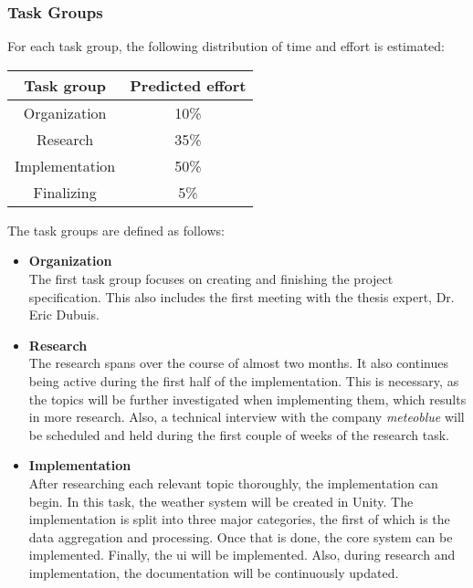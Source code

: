 
\clearpage
\subsubsection{Task Groups}
For each task group, the following distribution of time and effort is estimated:
\emptyline
\begin{tabular}{|c|c|}
    \hline
    \textbf{Task group}  & \textbf{Predicted effort}\\ \hline
    Organization        & 10\%                      \\ \hline
    Research            & 35\%                      \\ \hline
    Implementation      & 50\%                      \\ \hline
    Finalizing          & 5\%                       \\ \hline
\end{tabular}
\vspace{\baselineskip}

\noindent
The task groups are defined as follows:

\begin{itemize}
    \item \textbf{Organization} \\
    The first task group focuses on creating and finishing the project specification.
    This also includes the first meeting with the thesis expert, Dr. Eric Dubuis.
    
    \item \textbf{Research} \\
    The research spans over the course of almost two months. 
    It also continues being active during the first half of the implementation.
    This is necessary, as the topics will be further investigated when implementing them, which results in more research.
    Also, a technical interview with the company \emph{meteoblue} will be scheduled and held during the first couple of weeks of the research task.

    \item \textbf{Implementation} \\
    After researching each relevant topic thoroughly, the implementation can begin.
    In this task, the weather system will be created in Unity.
    The implementation is split into three major categories, the first of which is the data aggregation and processing. Once that is done, the core system can be implemented. Finally, the \gls{ui} will be implemented.
    Also, during research and implementation, the documentation will be continuously updated.
\end{itemize}

